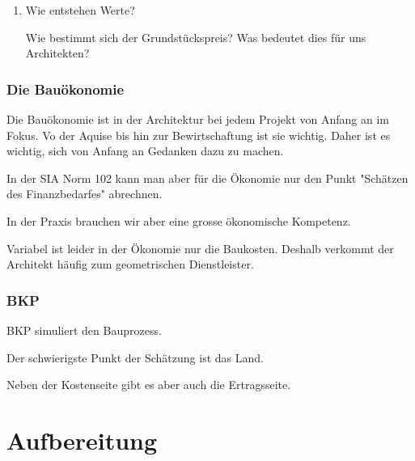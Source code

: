 \documentclass[11pt]{article}
\begin{document}
\begin{enumerate}
\item Wie entstehen Werte?
\label{sec-2-1-1-1}

Wie bestimmt sich der Grundstückspreis? Was bedeutet dies für uns
Architekten?
\end{enumerate}

\subsubsection{Die Bauökonomie}
\label{sec-2-1-2}

Die Bauökonomie ist in der Architektur bei jedem Projekt von Anfang an im
Fokus. Vo der Aquise bis hin zur Bewirtschaftung ist sie wichtig. Daher ist
es wichtig, sich von Anfang an Gedanken dazu zu machen.

In der SIA Norm 102 kann man aber für die Ökonomie nur den Punkt "Schätzen
des Finanzbedarfes" abrechnen.

In der Praxis brauchen wir aber eine grosse ökonomische Kompetenz.

Variabel ist leider in der Ökonomie nur die Baukosten. Deshalb verkommt der
Architekt häufig zum geometrischen Dienstleister.

\subsubsection{BKP}
\label{sec-2-1-3}

BKP simuliert den Bauprozess.

Der schwierigste Punkt der Schätzung ist das Land.

Neben der Kostenseite gibt es aber auch die Ertragsseite.

\section{Aufbereitung}
\label{sec-3}
\end{document}
